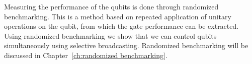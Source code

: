 \documentclass[12pt]{report}
\begin{document}
  Measuring the performance of the qubits is done through randomized benchmarking. This is a method based on repeated application of unitary operations on the qubit, from which the gate performance can be extracted. Using randomized benchmarking we show that we can control qubits simultaneously using selective broadcasting. Randomized benchmarking will be discussed in Chapter~\ref{ch:randomized benchmarking}.







\begin{appendices}



\end{appendices}



\end{document}
